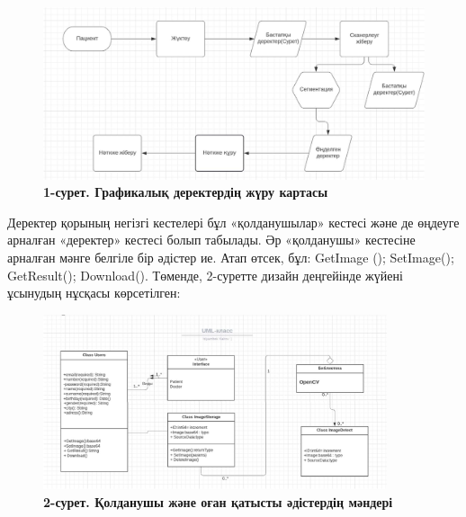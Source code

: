 \begin{figure}[H]
	\centering
	\includegraphics[width=1\textwidth]{assets/191}
	\caption*{\bfseries 1-сурет. Графикалық деректердің жүру картасы}
\end{figure}


\begin{multicols}{2}

Деректер қорының негізгі кестелері бұл «қолданушылар» кестесі және де
өңдеуге арналған «деректер» кестесі болып табылады. Әр «қолданушы»
кестесіне арналған мәнге белгіле бір әдістер ие. Атап өтсек, бұл:
GetImage (); SetImage(); GetResult(); Download(). Төменде, 2-суретте
дизайн деңгейінде жүйені ұсынудың нұсқасы көрсетілген:
\end{multicols}

\begin{figure}[H]
	\centering
	\includegraphics[height=0.6\textwidth, width=0.9\textwidth]{assets/192}
	\caption*{\bfseries 2-сурет. Қолданушы және оған қатысты әдістердің мәндері}
\end{figure}


